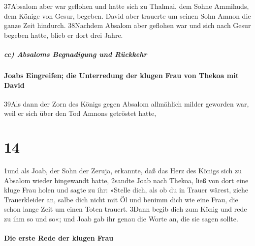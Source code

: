 37Absalom aber war geflohen und hatte sich zu Thalmai, dem Sohne
Ammihuds, dem Könige von Gesur, begeben. David aber trauerte um seinen
Sohn Amnon die ganze Zeit hindurch. 38Nachdem Absalom aber geflohen war
und sich nach Gesur begeben hatte, blieb er dort drei Jahre.

\hypertarget{cc-absaloms-begnadigung-und-ruxfcckkehr}{%
\subparagraph{cc) Absaloms Begnadigung und
Rückkehr}\label{cc-absaloms-begnadigung-und-ruxfcckkehr}}

\hypertarget{joabs-eingreifen-die-unterredung-der-klugen-frau-von-thekoa-mit-david}{%
\paragraph{Joabs Eingreifen; die Unterredung der klugen Frau von Thekoa
mit
David}\label{joabs-eingreifen-die-unterredung-der-klugen-frau-von-thekoa-mit-david}}

39Als dann der Zorn des Königs gegen Absalom allmählich milder geworden
war, weil er sich über den Tod Amnons getröstet hatte,

\hypertarget{section-13}{%
\section{14}\label{section-13}}

1und als Joab, der Sohn der Zeruja, erkannte, daß das Herz des Königs
sich zu Absalom wieder hingewandt hatte, 2sandte Joab nach Thekoa, ließ
von dort eine kluge Frau holen und sagte zu ihr: »Stelle dich, als ob du
in Trauer wärest, ziehe Trauerkleider an, salbe dich nicht mit Öl und
benimm dich wie eine Frau, die schon lange Zeit um einen Toten trauert.
3Dann begib dich zum König und rede zu ihm so und so«; und Joab gab ihr
genau die Worte an, die sie sagen sollte.

\hypertarget{die-erste-rede-der-klugen-frau}{%
\paragraph{Die erste Rede der klugen
Frau}\label{die-erste-rede-der-klugen-frau}}

